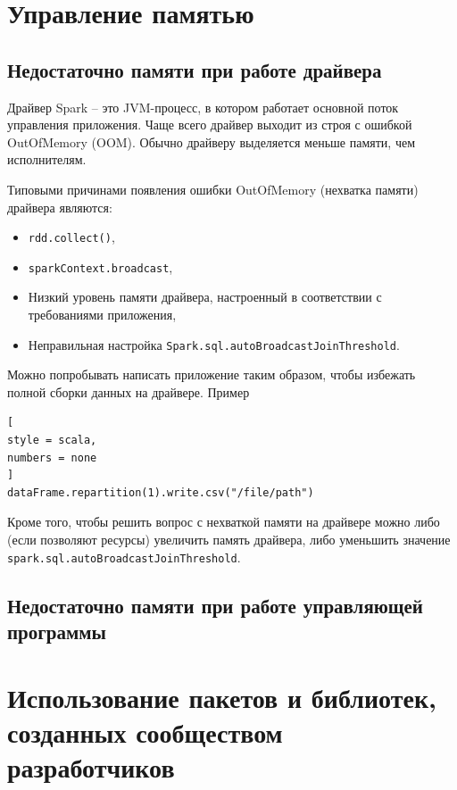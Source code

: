 \documentclass[%
	11pt,
	a4paper,
	utf8,
		]{article}
\begin{document}
\section{Управление памятью}

\subsection{Недостаточно памяти при работе драйвера}

Драйвер Spark -- это JVM-процесс, в котором работает основной поток управления приложения. Чаще всего драйвер выходит из строя с ошибкой OutOfMemory (OOM). Обычно драйверу выделяется меньше памяти, чем исполнителям.

Типовыми причинами появления ошибки OutOfMemory (нехватка памяти) драйвера являются:
\begin{itemize}
	\item \texttt{rdd.collect()},
	
	\item \texttt{sparkContext.broadcast},
	
	\item Низкий уровень памяти драйвера, настроенный в соответствии с требованиями приложения,
	
	\item Неправильная настройка \texttt{Spark.sql.autoBroadcastJoinThreshold}.
\end{itemize}

Можно попробывать написать приложение таким образом, чтобы избежать полной сборки данных на драйвере. Пример
\begin{lstlisting}[
style = scala,
numbers = none	
]
dataFrame.repartition(1).write.csv("/file/path") 
\end{lstlisting}

Кроме того, чтобы решить вопрос с нехваткой памяти на драйвере можно либо (если позволяют ресурсы) увеличить память драйвера, либо уменьшить значение \texttt{spark.sql.autoBroadcastJoinThreshold}.

\subsection{Недостаточно памяти при работе управляющей программы}



\section{Использование пакетов и библиотек, созданных сообществом разработчиков}
\end{document}
